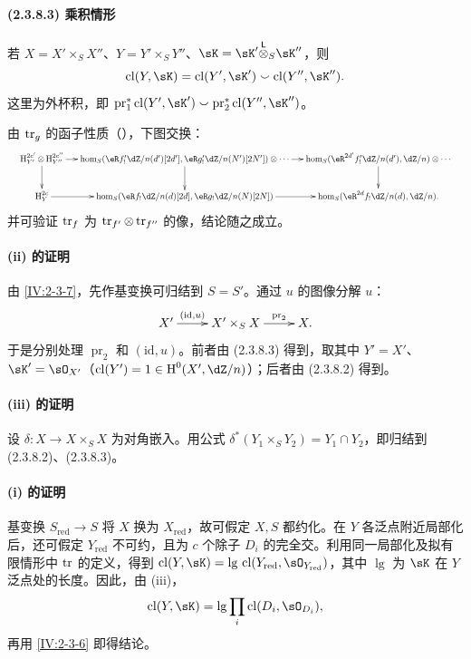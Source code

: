 \paragraph{(2.3.8.3) 乘积情形}
若 $X=X'\times_S X''$、$Y=Y'\times_S Y''$、$\sK=\sK'\lotimes_S\sK''$，则
\[
\cl(Y,\sK)=\cl(Y',\sK')\smallsmile\cl(Y'',\sK'').
\]
这里为外杯积，即 $\operatorname{pr}_1^*\cl(Y',\sK')\smallsmile\operatorname{pr}_2^*\cl(Y'',\sK'')$。

由 $\operatorname{tr}_g$ 的函子性质（\cite[XVIII 2.12]{sga4}），下图交换：
\[
\resizebox{\linewidth}{!}{$\xymatrix@C=13pt{
\h_{Y'}^{2c'}\otimes\h_{Y''}^{2c''}\ar[r]\ar[d]&
\hom_S(\eR f'_!\dZ/n(d')[2d'],\eR g'_!\dZ/n(N')[2N'])\otimes\cdots\ar[r]\ar[d]&
\hom_S(\eR^{2d'}f'_!\dZ/n(d'),\dZ/n)\otimes\cdots\ar[d]\\
\h_Y^{2c}\ar[r]&\hom_S(\eR f_!\dZ/n(d)[2d],\eR g_!\dZ/n(N)[2N])\ar[r]&
\hom_S(\eR^{2d}f_!\dZ/n(d),\dZ/n).
}$}
\]
并可验证 $\operatorname{tr}_f$ 为 $\operatorname{tr}_{f'}\otimes\operatorname{tr}_{f''}$ 的像，结论随之成立。

\paragraph{(ii) 的证明}
由 \ref{IV:2-3-7}，先作基变换可归结到 $S=S'$。通过 $u$ 的图像分解 $u$：
\[\xymatrix{X'\ar[r]^-{(\mathrm{id},u)}&X'\times_S X\ar[r]^-{\operatorname{pr}_2}&X.}\]
于是分别处理 $\operatorname{pr}_2$ 和 $(\mathrm{id},u)$。前者由 (2.3.8.3) 得到，取其中 $Y'=X'$、$\sK'=\sO_{X'}$（$\cl(Y')=1\in\h^0(X',\dZ/n)$）；后者由 (2.3.8.2) 得到。

\paragraph{(iii) 的证明}
设 $\delta:X\to X\times_S X$ 为对角嵌入。用公式 $\delta^*(Y_1\times_S Y_2)=Y_1\cap Y_2$，即归结到 (2.3.8.2)、(2.3.8.3)。

\paragraph{(i) 的证明}
基变换 $S_{\text{red}}\to S$ 将 $X$ 换为 $X_{\text{red}}$，故可假定 $X,S$ 都约化。在 $Y$ 各泛点附近局部化后，还可假定 $Y_{\text{red}}$ 不可约，且为 $c$ 个除子 $D_i$ 的完全交。利用同一局部化及拟有限情形中 $\operatorname{tr}$ 的定义，得到
$\cl(Y,\sK)=\operatorname{lg}\,\cl(Y_{\text{red}},\sO_{Y_{\text{red}}})$，其中 $\operatorname{lg}$ 为 $\sK$ 在 $Y$ 泛点处的长度。因此，由 (iii)，
\[
\cl(Y,\sK)=\operatorname{lg}\prod_i\cl(D_i,\sO_{D_i}),
\]
再用 \ref{IV:2-3-6} 即得结论。

